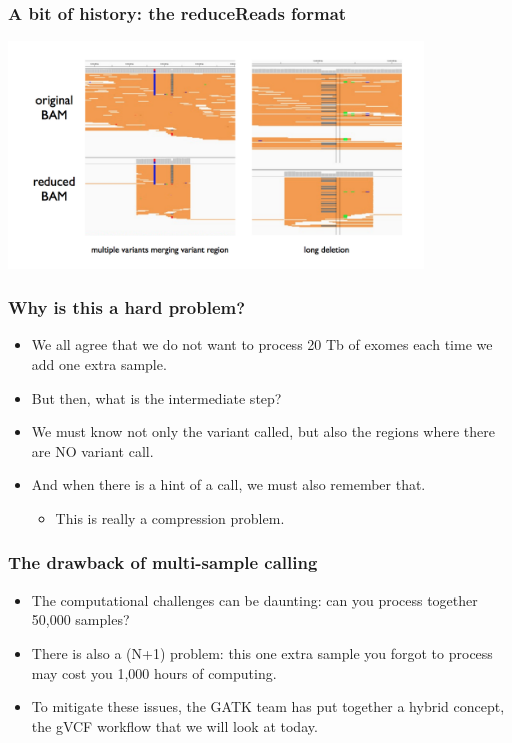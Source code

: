 \documentclass{beamer}
\begin{document}
\begin{frame}
  \frametitle{A bit of history: the reduceReads format}
  \begin{center}
    \includegraphics[width=11cm]{fig/reducedReads.png}
  \end{center}
\end{frame}


\begin{frame}
  \frametitle{Why is this a hard problem?}
  \begin{itemize}
  \item We all agree that we do not want to process 20 Tb of exomes each time we add one extra sample.
  \item But then, what is the intermediate step?
  \item We must know not only the variant called, but also the regions where there are NO variant call.
  \item And when there is a hint of a call, we must also remember that.
    \begin{itemize}
    \item This is really a compression problem.
    \end{itemize}
  \end{itemize}
\end{frame}

\begin{frame}
  \frametitle{The drawback of multi-sample calling}
  \begin{itemize}
  \item The computational challenges can be daunting: can you process together 50,000 samples?
  \item There is also a (N+1) problem: this one extra sample you forgot to process may cost you 1,000 hours of computing.
  \item To mitigate these issues, the GATK team has put together a hybrid concept, the gVCF workflow that we will look at today.
  \end{itemize}
\end{frame}
\end{document}
